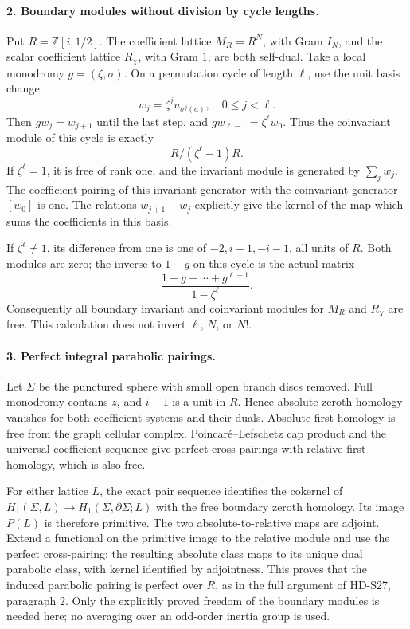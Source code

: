 \paragraph{2. Boundary modules without division by cycle lengths.}
Put \(R=\mathbb Z[i,1/2]\). The coefficient lattice
\(M_R=R^N\), with Gram \(I_N\), and the scalar coefficient
lattice \(R_\chi\), with Gram \(1\), are both self-dual.
Take a local monodromy \(g=(\zeta,\sigma)\). On a permutation
cycle of length \(\ell\), use the unit basis change
\[
 w_j=\zeta^j u_{\sigma^j(a)},\quad0\le j<\ell.
\]
Then \(g w_j=w_{j+1}\) until the last step, and
\(g w_{\ell-1}=\zeta^\ell w_0\). Thus the coinvariant module
of this cycle is exactly
\[
                  R/(\zeta^\ell-1)R.                     \tag{S33.4}
\]
If \(\zeta^\ell=1\), it is free of rank one, and the invariant
module is generated by \(\sum_jw_j\). The coefficient pairing
of this invariant generator with the coinvariant generator
\([w_0]\) is one. The relations \(w_{j+1}-w_j\) explicitly
give the kernel of the map which sums the coefficients in this
basis.

If \(\zeta^\ell\ne1\), its difference from one is one of
\(-2,i-1,-i-1\), all units of \(R\). Both modules are zero;
the inverse to \(1-g\) on this cycle is the actual matrix
\[
            \frac{1+g+\cdots+g^{\ell-1}}{1-\zeta^\ell}.
\]
Consequently all boundary invariant and coinvariant modules for
\(M_R\) and \(R_\chi\) are free. This calculation does not
invert \(\ell\), \(N\), or \(N!\).

\paragraph{3. Perfect integral parabolic pairings.}
Let \(\Sigma\) be the punctured sphere with small open branch
discs removed. Full monodromy contains \(z\), and \(i-1\) is
a unit in \(R\). Hence absolute zeroth homology vanishes for
both coefficient systems and their duals. Absolute first homology
is free from the graph cellular complex. Poincar\'e--Lefschetz
cap product and the universal coefficient sequence give perfect
cross-pairings with relative first homology, which is also free.

For either lattice \(L\), the exact pair sequence identifies the
cokernel of
\(H_1(\Sigma,L)\to H_1(\Sigma,\partial\Sigma;L)\)
with the free boundary zeroth homology. Its image \(P(L)\) is
therefore primitive. The two absolute-to-relative maps are adjoint.
Extend a functional on the primitive image to the relative module
and use the perfect cross-pairing: the resulting absolute class
maps to its unique dual parabolic class, with kernel identified by
adjointness. This proves that the induced parabolic pairing is
perfect over \(R\), as in the full argument of HD-S27,
paragraph 2. Only the explicitly proved freedom of the boundary
modules is needed here; no averaging over an odd-order inertia
group is used.

